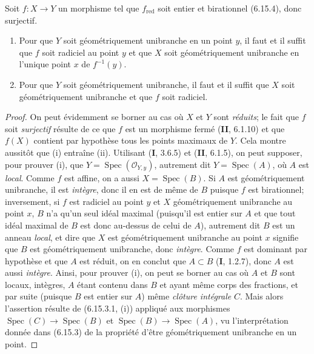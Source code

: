 \begin{proposition}[6.15.5]
\label{IV.2.s6.15.5-fr}
Soit $f:X\to Y$ un morphisme tel que $f_{\mathrm{red}}$ soit entier et
birationnel \textup{(6.15.4)}, donc surjectif.
\begin{enumerate}
\item[\textup{(i)}] Pour que $Y$ soit géométriquement unibranche en un point $y$,
il faut et il suffit que $f$ soit radiciel au point $y$ et que $X$ soit
géométriquement unibranche en l'unique point $x$ de $f^{-1}(y)$.
\item[\textup{(ii)}] Pour que $Y$ soit géométriquement unibranche, il faut et il
suffit que $X$ soit géométriquement unibranche et que $f$ soit radiciel.
\end{enumerate}
\end{proposition}

\begin{proof}
On peut évidemment se borner au cas où $X$ et $Y$ sont \emph{réduits}; le fait
que $f$ soit \emph{surjectif} résulte de ce que $f$ est un morphisme fermé (\textbf{II},
6.1.10) et que $f(X)$ contient par hypothèse tous les points maximaux de
$Y$. Cela montre aussitôt que (i) entraîne (ii). Utilisant (\textbf{I}, 3.6.5) et
(\textbf{II}, 6.1.5), on peut supposer, pour prouver (i), que
$Y=\operatorname{Spec}(\mathcal O_{Y,y})$,
autrement dit
$Y=\operatorname{Spec}(A)$, où $A$ est \emph{local}. Comme $f$ est affine, on a
aussi $X=\operatorname{Spec}(B)$. Si $A$ est géométriquement unibranche,
il est \emph{intègre}, donc il en est de même de $B$ puisque $f$ est birationnel;
inversement, si $f$ est radiciel au point $y$ et $X$ géométriquement
unibranche au point $x$, $B$ n'a qu'un seul idéal maximal (puisqu'il est
entier sur $A$ et que tout idéal maximal de $B$ est donc au-dessus de celui
de $A$), autrement dit $B$ est un anneau \emph{local}, et dire que $X$ est
géométriquement unibranche au point $x$ signifie que $B$ est
géométriquement unibranche, donc \emph{intègre}. Comme $f$ est dominant par
hypothèse et que $A$ est réduit, on en conclut que $A\subset B$ (\textbf{I},
1.2.7), donc $A$ est aussi \emph{intègre}. Ainsi, pour prouver (i), on peut se
borner au cas où $A$ et $B$ sont locaux, intègres, $A$ étant contenu dans
$B$ et ayant même corps des fractions, et par suite (puisque $B$ est entier
sur $A$) même \emph{clôture intégrale} $C$. Mais alors l'assertion résulte de
(6.15.3.1, (i)) appliqué aux morphismes
$\operatorname{Spec}(C)\to\operatorname{Spec}(B)$ et
$\operatorname{Spec}(B)\to\operatorname{Spec}(A)$, vu l'interprétation
donnée dans (6.15.3) de la propriété d'être géométriquement unibranche en
un point.
\end{proof}


